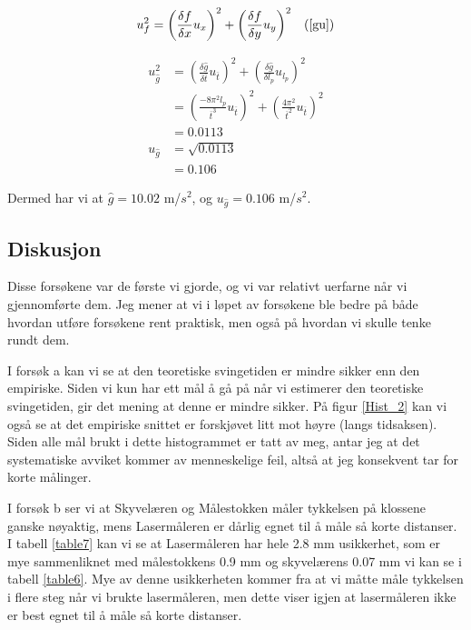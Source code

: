 \begin{align*}
    u_f^2 = \left(\frac{\delta f}{\delta x} u_x\right)^2 + \left(\frac{\delta f}{\delta y} u_y\right)^2 \alignref{gu}
\end{align*}

\begin{align*}
    u_{\hat{g}}^2 &= \left(\frac{\delta \hat{g}}{\delta \overline{t}} u_{\overline{t}}\right)^2 + \left(\frac{\delta \hat{g}}{\delta l_p} u_{l_p}\right)^2\\
    &=  \left(\frac{-8\pi^2l_p}{\overline{t}^3} u_{\overline{t}}\right)^2 + \left(\frac{4\pi^2}{\overline{t}^2} u_{\overline{t}}\right)^2\\
    &= 0.0113\\
    u_{\hat{g}} &= \sqrt{0.0113}\\
    &= 0.106
\end{align*}

Dermed har vi at $\hat{g} = 10.02$ m/$s^2$, og $u_{\hat{g}} = 0.106$ m/$s^2$.

\subsection{Diskusjon}

Disse forsøkene var de første vi gjorde, og vi var relativt uerfarne når vi gjennomførte dem. Jeg mener at vi i løpet av forsøkene ble bedre på både hvordan utføre forsøkene rent praktisk, men også på hvordan vi skulle tenke rundt dem. \medskip

I forsøk a kan vi se at den teoretiske svingetiden er mindre sikker enn den empiriske. Siden vi kun har ett mål å gå på når vi estimerer den teoretiske svingetiden, gir det mening at denne er mindre sikker. På figur \ref{Hist_2} kan vi også se at det empiriske snittet er forskjøvet litt mot høyre (langs tidsaksen). Siden alle mål brukt i dette histogrammet er tatt av meg, antar jeg at det systematiske avviket kommer av menneskelige feil, altså at jeg konsekvent tar for korte målinger.\medskip

I forsøk b ser vi at Skyvelæren og Målestokken måler tykkelsen på klossene ganske nøyaktig, mens Lasermåleren er dårlig egnet til å måle så korte distanser. I tabell \ref{table7} kan vi se at Lasermåleren har hele 2.8 mm usikkerhet, som er mye sammenliknet med målestokkens 0.9 mm og skyvelærens 0.07 mm vi kan se i tabell \ref{table6}. Mye av denne usikkerheten kommer fra at vi måtte måle tykkelsen i flere steg når vi brukte lasermåleren, men dette viser igjen at lasermåleren ikke er best egnet til å måle så korte distanser.

